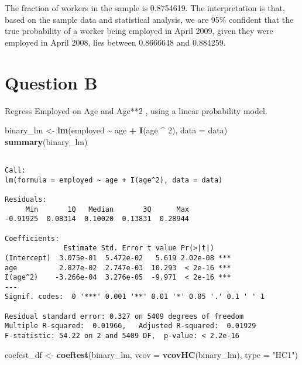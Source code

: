 \documentclass[
]{article}
\newenvironment{Shaded}{\begin{snugshade}}{\end{snugshade}}
\newcommand{\AttributeTok}[1]{\textcolor[rgb]{0.13,0.29,0.53}{#1}}
\newcommand{\DecValTok}[1]{\textcolor[rgb]{0.00,0.00,0.81}{#1}}
\newcommand{\FunctionTok}[1]{\textcolor[rgb]{0.13,0.29,0.53}{\textbf{#1}}}
\newcommand{\NormalTok}[1]{#1}
\newcommand{\OtherTok}[1]{\textcolor[rgb]{0.56,0.35,0.01}{#1}}
\newcommand{\SpecialCharTok}[1]{\textcolor[rgb]{0.81,0.36,0.00}{\textbf{#1}}}
\newcommand{\StringTok}[1]{\textcolor[rgb]{0.31,0.60,0.02}{#1}}
\begin{document}
The fraction of workers in the sample is 0.8754619. The interpretation
is that, based on the sample data and statistical analysis, we are 95\%
confident that the true probability of a worker being employed in April
2009, given they were employed in April 2008, lies between 0.8666648 and
0.884259.

\hypertarget{question-b}{%
\section{Question B}\label{question-b}}

Regress Employed on Age and Age**2 , using a linear probability model.

\begin{Shaded}
\begin{Highlighting}[]
\NormalTok{binary\_lm }\OtherTok{\textless{}{-}} \FunctionTok{lm}\NormalTok{(employed }\SpecialCharTok{\textasciitilde{}}\NormalTok{ age }\SpecialCharTok{+} \FunctionTok{I}\NormalTok{(age }\SpecialCharTok{\^{}} \DecValTok{2}\NormalTok{), }\AttributeTok{data =}\NormalTok{ data)}
\FunctionTok{summary}\NormalTok{(binary\_lm)}
\end{Highlighting}
\end{Shaded}

\begin{verbatim}

Call:
lm(formula = employed ~ age + I(age^2), data = data)

Residuals:
     Min       1Q   Median       3Q      Max 
-0.91925  0.08314  0.10020  0.13831  0.28944 

Coefficients:
              Estimate Std. Error t value Pr(>|t|)    
(Intercept)  3.075e-01  5.472e-02   5.619 2.02e-08 ***
age          2.827e-02  2.747e-03  10.293  < 2e-16 ***
I(age^2)    -3.266e-04  3.276e-05  -9.971  < 2e-16 ***
---
Signif. codes:  0 '***' 0.001 '**' 0.01 '*' 0.05 '.' 0.1 ' ' 1

Residual standard error: 0.327 on 5409 degrees of freedom
Multiple R-squared:  0.01966,   Adjusted R-squared:  0.01929 
F-statistic: 54.22 on 2 and 5409 DF,  p-value: < 2.2e-16
\end{verbatim}

\begin{Shaded}
\begin{Highlighting}[]
\NormalTok{coefest\_df }\OtherTok{\textless{}{-}} \FunctionTok{coeftest}\NormalTok{(binary\_lm, }\AttributeTok{vcov =} \FunctionTok{vcovHC}\NormalTok{(binary\_lm), }\AttributeTok{type =} \StringTok{"HC1"}\NormalTok{)}
\end{Highlighting}
\end{Shaded}
\end{document}
